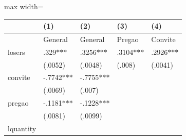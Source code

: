 \documentclass[10pt]{article}
\begin{document}
{{{{\begin{table}[H]
\begin{adjustbox}{max width=\textwidth}
\begin{tabular}{p{3.98cm}p{2.52cm}p{2.53cm}p{2.53cm}p{2.45cm}}
\hline
\multicolumn{1}{|p{5.3cm}}{} & 
\multicolumn{1}{|p{3.14cm}}{\centering
 (1)} & 
\multicolumn{1}{|p{3.02cm}}{\centering
 (2)} & 
\multicolumn{1}{|p{3.02cm}}{\centering
 (3)} & 
\multicolumn{1}{|p{3.02cm}|}{\centering
 (4)} \\ 
\hline
\multicolumn{1}{|p{5.3cm}}{} & 
\multicolumn{1}{|p{3.14cm}}{\centering
    General} & 
\multicolumn{1}{|p{3.02cm}}{\centering
    General} & 
\multicolumn{1}{|p{3.02cm}}{\centering
 Pregao} & 
\multicolumn{1}{|p{3.02cm}|}{\centering
    Convite} \\ 
\hline
\multicolumn{1}{|p{5.3cm}}{ losers} & 
\multicolumn{1}{|p{3.14cm}}{\centering
.329$\ast$$\ast$$\ast$} & 
\multicolumn{1}{|p{3.02cm}}{\centering
.3256$\ast$$\ast$$\ast$} & 
\multicolumn{1}{|p{3.02cm}}{\centering
.3104$\ast$$\ast$$\ast$} & 
\multicolumn{1}{|p{3.02cm}|}{\centering
.2926$\ast$$\ast$$\ast$} \\ 
\hline
\multicolumn{1}{|p{5.3cm}}{} & 
\multicolumn{1}{|p{3.14cm}}{\centering
(.0052)} & 
\multicolumn{1}{|p{3.02cm}}{\centering
(.0048)} & 
\multicolumn{1}{|p{3.02cm}}{\centering
(.008)} & 
\multicolumn{1}{|p{3.02cm}|}{\centering
(.0041)} \\ 
\hline
\multicolumn{1}{|p{5.3cm}}{ convite} & 
\multicolumn{1}{|p{3.14cm}}{\centering
-.7742$\ast$$\ast$$\ast$} & 
\multicolumn{1}{|p{3.02cm}}{\centering
-.7755$\ast$$\ast$$\ast$} & 
\multicolumn{1}{|p{3.02cm}}{} & 
\multicolumn{1}{|p{3.02cm}|}{} \\ 
\hline
\multicolumn{1}{|p{5.3cm}}{} & 
\multicolumn{1}{|p{3.14cm}}{\centering
(.0069)} & 
\multicolumn{1}{|p{3.02cm}}{\centering
(.007)} & 
\multicolumn{1}{|p{3.02cm}}{} & 
\multicolumn{1}{|p{3.02cm}|}{} \\ 
\hline
\multicolumn{1}{|p{5.3cm}}{ pregao} & 
\multicolumn{1}{|p{3.14cm}}{\centering
-.1181$\ast$$\ast$$\ast$} & 
\multicolumn{1}{|p{3.02cm}}{\centering
-.1228$\ast$$\ast$$\ast$} & 
\multicolumn{1}{|p{3.02cm}}{} & 
\multicolumn{1}{|p{3.02cm}|}{} \\ 
\hline
\multicolumn{1}{|p{5.3cm}}{} & 
\multicolumn{1}{|p{3.14cm}}{\centering
(.0081)} & 
\multicolumn{1}{|p{3.02cm}}{\centering
(.0099)} & 
\multicolumn{1}{|p{3.02cm}}{} & 
\multicolumn{1}{|p{3.02cm}|}{} \\ 
\hline
\multicolumn{1}{|p{5.3cm}}{ lquantity} & 
\multicolumn{1}{|p{3.14cm}}{\centering
}
\end{tabular}
\end{adjustbox}
\end{table}}}}}
\end{document}
